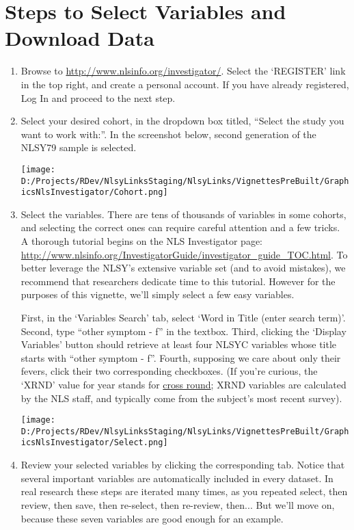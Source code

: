 \documentclass{article}\usepackage[]{graphicx}\usepackage[]{color}
\begin{document}
\section{Steps to Select Variables and Download Data}
\begin{enumerate}
\item Browse to \url{http://www.nlsinfo.org/investigator/}.  Select the `REGISTER' link in the top right, and create a personal account.  If you have already registered, Log In and proceed to the next step.
\item Select your desired cohort, in the dropdown box titled, ``Select the study you want to work with:''.  In the screenshot below, second generation of the NLSY79 sample is selected.

\texttt{[image: D:/Projects/RDev/NlsyLinksStaging/NlsyLinks/VignettesPreBuilt/GraphicsNlsInvestigator/Cohort.png]}

\item Select the variables.  There are tens of thousands of variables in some cohorts, and selecting the correct ones can require careful attention and a few tricks.  A thorough tutorial begins on the NLS Investigator page: \url{http://www.nlsinfo.org/InvestigatorGuide/investigator_guide_TOC.html}.  To better leverage the NLSY's extensive variable set (and to avoid mistakes), we recommend that researchers dedicate time to this tutorial.  However for the purposes of this vignette, we'll simply select a few easy variables.  

First, in the `Variables Search' tab, select `Word in Title (enter search term)'.  Second, type ``other symptom - f'' in the textbox.  Third, clicking the `Display Variables' button should retrieve at least four NLSYC variables whose title starts with ``other symptom - f''.  Fourth, supposing we care about only their fevers, click their two corresponding checkboxes.  (If you're curious, the `XRND' value for year stands for \href{http://www.bls.gov/nls/nls138.pdf}{cross round}; XRND variables are calculated by the NLS staff, and typically come from the subject's most recent survey).

\texttt{[image: D:/Projects/RDev/NlsyLinksStaging/NlsyLinks/VignettesPreBuilt/GraphicsNlsInvestigator/Select.png]}

\item Review your selected variables by clicking the corresponding tab.  Notice that several important variables are automatically included in every  dataset.  In real research these steps are iterated many times, as you repeated select, then review, then save, then re-select, then re-review, then...  But we'll move on, because these seven variables are good enough for an example.


\end{enumerate}
\end{document}

